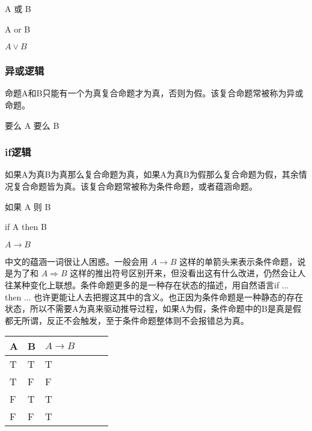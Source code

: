 \documentclass[12pt,oneside]{book}
\begin{document}
\begin{framed}
A 或 B
\end{framed}

\begin{framed}
A or B
\end{framed}

\begin{framed}
$A \vee B$
\end{framed}

\subsubsection{异或逻辑}
命题A和B只能有一个为真复合命题才为真，否则为假。该复合命题常被称为异或命题。

\begin{framed}
要么 A 要么 B
\end{framed}

\subsubsection{if逻辑}
如果A为真B为真那么复合命题为真，如果A为真B为假那么复合命题为假，其余情况复合命题皆为真。该复合命题常被称为条件命题，或者蕴涵命题。

\begin{framed}
如果 A 则 B
\end{framed}

\begin{framed}
if A then B
\end{framed}

\begin{framed}
$A \rightarrow B$
\end{framed}

中文的蕴涵一词很让人困惑。一般会用 $A \to B$ 这样的单箭头来表示条件命题，说是为了和 $A \Rightarrow B$ 这样的推出符号区别开来，但没看出这有什么改进，仍然会让人往某种变化上联想。条件命题更多的是一种存在状态的描述，用自然语言if ... then ... 也许更能让人去把握这其中的含义。也正因为条件命题是一种静态的存在状态，所以不需要A为真来驱动推导过程，如果A为假，条件命题中的B是真是假都无所谓，反正不会触发，至于条件命题整体则不会报错总为真。



\begin{table}[H]
\begin{tabular}{@{}llllll@{}}
\toprule
{A} & {B}  & {$A \to B$} \\ \midrule

{T}          & {T}       & {T}   \\
{T}          & {F}       & {F}   \\
{F}          & {T}        & {T}   \\
{F}          & {F}       & {T}   \\ \bottomrule
\end{tabular}
\end{table}
\end{document}
